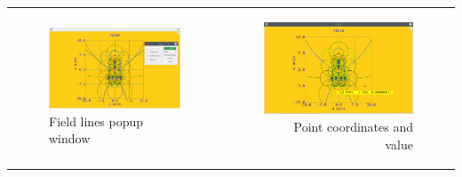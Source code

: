 \documentclass[10pt]{article}
\begin{document}
\begin{itemize}
\hspace*{-5mm}
\begin{tabular}{lr}
\begin{minipage}{.5\linewidth}
    \begin{figure}[H]
        \begin{center}
            \includegraphics[width=0.8\linewidth]{damqt320_2D_field_lines_popup.png}
        \end{center}
        \vspace*{-1mm}
        \caption{Field lines popup window \label{fig:3_12b}}
    \end{figure}
\end{minipage}
&
\begin{minipage}{.5\linewidth}
    \begin{figure}[H]
        \begin{center}
            \includegraphics[width=0.8\linewidth]{damqt320_2D_point.png}
        \end{center}
        \vspace*{-1mm}
        \caption{Point coordinates and value \label{fig:3_13}}
    \end{figure}
\end{minipage}
\end{tabular}


\end{itemize}
\end{document}
